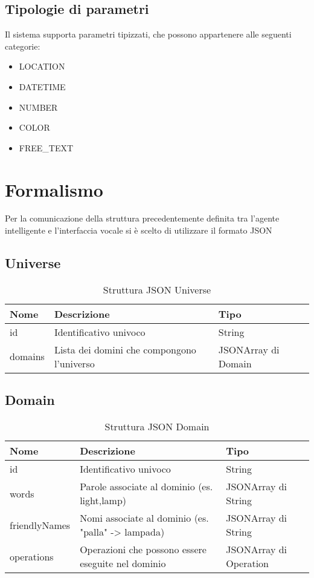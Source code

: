 \documentclass[twoside]{supsistudent}
\begin{document}
\subsection{Tipologie di parametri}
Il sistema supporta parametri tipizzati, che possono appartenere alle seguenti categorie:
\begin{itemize}
	\item LOCATION
	\item DATETIME
	\item NUMBER
	\item COLOR
	\item FREE\_TEXT
\end{itemize}
\section{Formalismo}
Per la comunicazione della struttura precedentemente definita tra l'agente intelligente e l'interfaccia vocale si è scelto di utilizzare il formato JSON

\subsection{Universe}
\begin{table}[H]
\centering
\caption{Struttura JSON Universe}
\label{Struttura JSON Universe}
\begin{tabular}{@{}|l|l|l|@{}}
\toprule
Nome    & Descrizione                                & Tipo                \\ \midrule
id      & Identificativo univoco                     & String             \\ \midrule
domains & Lista dei domini che compongono l'universo & JSONArray di Domain \\ \bottomrule
\end{tabular}
\end{table}

\subsection{Domain}
\begin{table}[H]
\centering
\caption{Struttura JSON Domain}
\label{Struttura JSON Domain}
\begin{tabular}{@{}|l|l|l|@{}}
\toprule
Nome          & Descrizione                                                                   & Tipo                   \\ \midrule
id            & Identificativo univoco                                                        & String                 \\ \midrule
words         & Parole associate al dominio (es. light,lamp)                         & JSONArray di String    \\ \midrule
friendlyNames & Nomi associate al dominio (es. "palla" -> lampada) & JSONArray di String    \\ \midrule
operations    & Operazioni che possono essere eseguite nel dominio                   & JSONArray di Operation \\ \bottomrule
\end{tabular}
\end{table}
\end{document}
